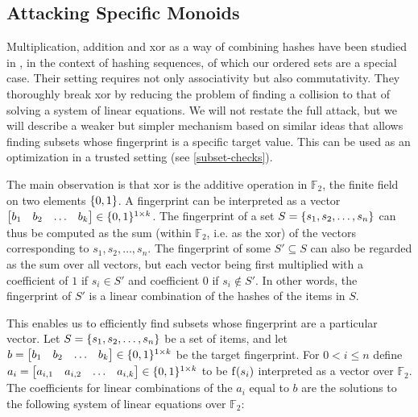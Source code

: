\subsection{Attacking Specific Monoids}

Multiplication, addition and xor as a way of combining hashes have been studied in \cite{bellare1997new}, in the context of hashing sequences, of which our ordered sets are a special case. Their setting requires not only associativity but also commutativity. They thoroughly break xor by reducing the problem of finding a collision to that of solving a system of linear equations. We will not restate the full attack, but we will describe a weaker but simpler mechanism based on similar ideas that allows finding subsets whose fingerprint is a specific target value. This can be used as an optimization in a trusted setting (see \cref{subset-checks}).

The main observation is that xor is the additive operation in $\mathds{F}_2$, the finite field on two elements $\{0, 1\}$. A fingerprint can be interpreted as a vector $\begin{bmatrix}b_1 & b_2 & \ldots & b_k\end{bmatrix} \in \{0, 1\}^{1 \times k}$. The fingerprint of a set $S = \{s_1, s_2, \ldots, s_n\}$ can thus be computed as the sum (within $\mathds{F}_2$, i.e. as the xor) of the vectors corresponding to $s_1, s_2, \ldots, s_n$. The fingerprint of some $S' \subseteq S$ can also be regarded as the sum over all vectors, but each vector being first multiplied with a coefficient of $1$ if $s_i \in S'$ and coefficient $0$ if $s_i \notin S'$. In other words, the fingerprint of $S'$ is a linear combination of the hashes of the items in $S$. 

This enables us to efficiently find subsets whose fingerprint are a particular vector. Let $S = \{s_1, s_2, \ldots, s_n\}$ be a set of items, and let $b = \begin{bmatrix}b_1 & b_2 & \ldots & b_k\end{bmatrix} \in \{0, 1\}^{1 \times k}$ be the target fingerprint. For $0 < i \leq n$ define $a_i = \begin{bmatrix}a_{i, 1} & a_{i, 2} & \ldots & a_{i, k}\end{bmatrix} \in \{0, 1\}^{1 \times k}$ to be $\operatorname{f}(s_i)$ interpreted as a vector over $\mathds{F}_2$. The coefficients for linear combinations of the $a_i$ equal to $b$ are the solutions to the following system of linear equations over $\mathds{F}_2$:

